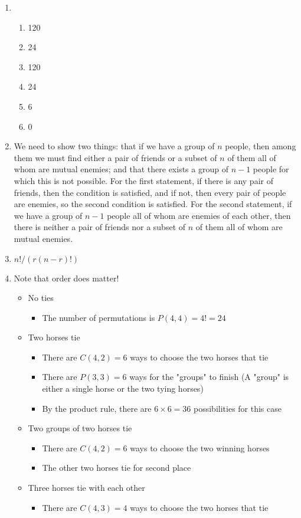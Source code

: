 \documentclass{../../cls/sig-alternate-05-2015}
\begin{document}
\begin{enumerate}

	\item 
	\begin{enumerate}
		\item 120 \item 24 \item 120 \item 24
		\item 6 \item 0
	\end{enumerate}
	\item We need to show two
	things: that if we have a group of $n$ people, then among them
	we must find either a pair of friends or a subset of $n$ of them
	all of whom are mutual enemies; and that there exists a group
	of $n-1$ people for which this is not possible. For the first
	statement, if there is any pair of friends, then the condition is
	satisfied, and if not, then every pair of people are enemies, so
	the second condition is satisfied. For the second statement, if
	we have a group of $n-1$ people all of whom are enemies of
	each other, then there is neither a pair of friends nor a subset
	of $n$ of them all of whom are mutual enemies.
	\item $n!/(r(n − r)!)$
	\item Note that order does matter!
	\begin{itemize}
		\item No ties
			\begin{itemize}
				\item The number of permutations is $P(4,4) = 4! = 24$
			\end{itemize}
		\item Two horses tie
		\begin{itemize}
			\item There are $C(4,2) = 6$ ways to choose the two horses that tie
			\item There are $P(3,3) = 6$ ways for the "groups" to finish (A "group" is either a single horse or the two tying horses)
			\item By the product rule, there are $6\times 6 = 36$ possibilities for this case
		\end{itemize}
		\item Two groups of two horses tie
			\begin{itemize}
				\item There are $C(4,2) = 6$ ways to choose the two winning horses
				
				\item  The other two horses tie for second place
			\end{itemize}		
		\item  Three horses tie with each other
			\begin{itemize}
				\item There are $C(4,3) = 4$ ways to choose the two horses that tie
				

\end{itemize}
\end{itemize}
\end{enumerate}
\end{document}
